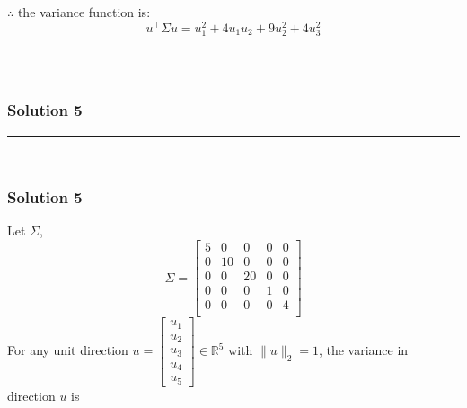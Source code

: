 \documentclass{article}
\begin{document}
\subsubsection*{\normalfont}{$\therefore$ the variance function is:} 
$$u^\top\Sigma u = u_1^2 + 4u_1u_2 + 9u_2^2 + 4u_3^2$$

\noindent\rule{\textwidth}{0.4pt}\\

\newpage

\subsubsection*{Solution 5}
\noindent\rule{\textwidth}{0.4pt}\\
\subsubsection*{Solution 5}
Let $\Sigma$,
\[
\Sigma =
\begin{bmatrix}
    5 & 0 & 0 & 0 & 0 \\
    0 & 10 & 0 & 0 & 0 \\
    0 & 0 & 20 & 0 & 0 \\
    0 & 0 & 0 & 1 & 0 \\
    0 & 0 & 0 & 0 & 4 \\
\end{bmatrix}
\]
For any unit direction $u=\begin{bmatrix}u_1\\u_2\\u_3\\u_4\\u_5\end{bmatrix}\in\mathbb{R}^5$ with $\|u\|_2=1$, the variance in direction $u$ is
\end{document}
